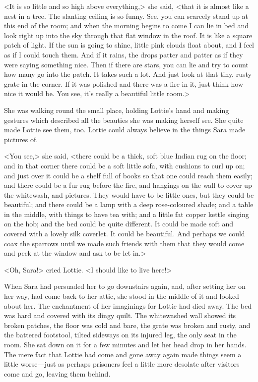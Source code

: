 <It is so little and so high above everything,> she said, <that it is almost like a nest in a tree. The slanting ceiling is so funny. See, you can scarcely stand up at this end of the room; and when the morning begins to come I can lie in bed and look right up into the sky through that flat window in the roof. It is like a square patch of light. If the sun is going to shine, little pink clouds float about, and I feel as if I could touch them. And if it rains, the drops patter and patter as if they were saying something nice. Then if there are stars, you can lie and try to count how many go into the patch. It takes such a lot. And just look at that tiny, rusty grate in the corner. If it was polished and there was a fire in it, just think how nice it would be. You see, it's really a beautiful little room.>

She was walking round the small place, holding Lottie's hand and making gestures which described all the beauties she was making herself see. She quite made Lottie see them, too. Lottie could always believe in the things Sara made pictures of.

<You see,> she said, <there could be a thick, soft blue Indian rug on the floor; and in that corner there could be a soft little sofa, with cushions to curl up on; and just over it could be a shelf full of books so that one could reach them easily; and there could be a fur rug before the fire, and hangings on the wall to cover up the whitewash, and pictures. They would have to be little ones, but they could be beautiful; and there could be a lamp with a deep rose-coloured shade; and a table in the middle, with things to have tea with; and a little fat copper kettle singing on the hob; and the bed could be quite different. It could be made soft and covered with a lovely silk coverlet. It could be beautiful. And perhaps we could coax the sparrows until we made such friends with them that they would come and peck at the window and ask to be let in.>

<Oh, Sara!> cried Lottie. <I should like to live here!>

When Sara had persuaded her to go downstairs again, and, after setting her on her way, had come back to her attic, she stood in the middle of it and looked about her. The enchantment of her imaginings for Lottie had died away. The bed was hard and covered with its dingy quilt. The whitewashed wall showed its broken patches, the floor was cold and bare, the grate was broken and rusty, and the battered footstool, tilted sideways on its injured leg, the only seat in the room. She sat down on it for a few minutes and let her head drop in her hands. The mere fact that Lottie had come and gone away again made things seem a little worse—just as perhaps prisoners feel a little more desolate after visitors come and go, leaving them behind.

